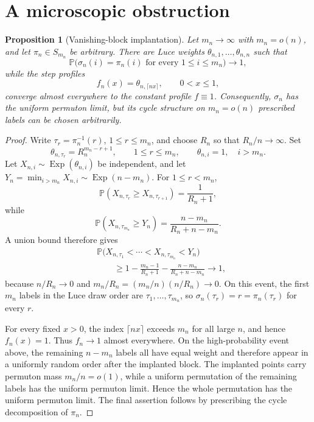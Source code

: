 \documentclass[11pt]{article}
\newtheorem{proposition}[theorem]{Proposition}
\theoremstyle{remark}
\newcommand{\Pp}{\mathbb P}
\newcommand{\Exp}{\operatorname{Exp}}
\begin{document}

\section{A microscopic obstruction}

\begin{proposition}[Vanishing-block implantation]\label{prop:implantation}
Let $m_n\to\infty$ with $m_n=o(n)$, and let $\pi_n\in S_{m_n}$ be arbitrary.
There are Luce weights $\theta_{n,1},\ldots,\theta_{n,n}$ such that
\[
        \Pp\bigl(\sigma_n(i)=\pi_n(i)
        \text{ for every }1\le i\le m_n\bigr)\longrightarrow1,
\]
while the step profiles
\[
        f_n(x)=\theta_{n,\lceil nx\rceil},\qquad 0<x\le1,
\]
converge almost everywhere to the constant profile $f\equiv1$.  Consequently,
$\sigma_n$ has the uniform permuton limit,
but its cycle structure on $m_n=o(n)$ prescribed labels can be chosen
arbitrarily.
\end{proposition}

\begin{proof}
Write $\tau_r=\pi_n^{-1}(r)$, $1\le r\le m_n$, and choose $R_n$ so that
$R_n/n\to\infty$.  Set
\[
        \theta_{n,\tau_r}=R_n^{m_n-r+1},
        \qquad 1\le r\le m_n,
        \qquad
        \theta_{n,i}=1,
        \quad i>m_n.
\]
Let $X_{n,i}\sim\Exp(\theta_{n,i})$ be independent, and let
$Y_n=\min_{i>m_n}X_{n,i}\sim\Exp(n-m_n)$.  For $1\le r<m_n$,
\[
        \Pp(X_{n,\tau_r}\ge X_{n,\tau_{r+1}})
        =\frac1{R_n+1},
\]
while
\[
        \Pp(X_{n,\tau_{m_n}}\ge Y_n)
        =\frac{n-m_n}{R_n+n-m_n}.
\]
A union bound therefore gives
\[
\begin{aligned}
&\Pp\bigl(X_{n,\tau_1}<\cdots<X_{n,\tau_{m_n}}<Y_n\bigr)\\
&\qquad\ge1-\frac{m_n-1}{R_n+1}
        -\frac{n-m_n}{R_n+n-m_n}\longrightarrow1,
\end{aligned}
\]
because $n/R_n\to0$ and
$m_n/R_n=(m_n/n)(n/R_n)\to0$.
On this event, the first $m_n$ labels in the Luce draw order are
$\tau_1,\ldots,\tau_{m_n}$, so
$\sigma_n(\tau_r)=r=\pi_n(\tau_r)$ for every $r$.

For every fixed $x>0$, the index $\lceil nx\rceil$ exceeds $m_n$ for all
large $n$, and hence $f_n(x)=1$.  Thus $f_n\to1$ almost everywhere.  On the
high-probability event above, the remaining $n-m_n$ labels all have equal
weight and therefore appear in a uniformly random order after the implanted
block.  The implanted points carry permuton mass $m_n/n=o(1)$, while a uniform
permutation of the remaining labels has the uniform permuton limit.  Hence the
whole permutation has the uniform permuton limit.  The final assertion follows
by prescribing the cycle decomposition of $\pi_n$.
\end{proof}
\end{document}
